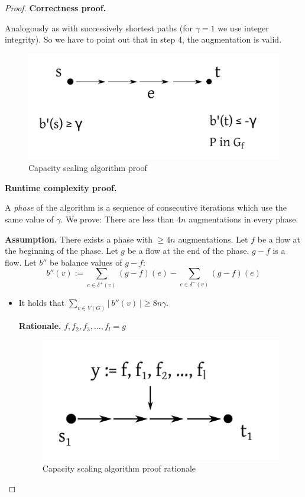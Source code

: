 \documentclass{article}
\newcommand{\card}[1]{\left|\:\!#1\:\!\right|}
\begin{document}
\begin{proof}
  \textbf{Correctness proof.}

  Analogously as with successively shortest paths (for $\gamma = 1$ we use integer integrity).
  So we have to point out that in step 4, the augmentation is valid.

  \begin{figure}[ht]
   \begin{center}
    \includegraphics{img/capacity_scaling_algo_proof.pdf}
    \caption{Capacity scaling algorithm proof}
   \end{center}
  \end{figure}

  \textbf{Runtime complexity proof.}

  A \emph{phase} of the algorithm is a sequence of consecutive iterations which use the same value of $\gamma$. We prove: There are less than $4n$ augmentations in every phase.

  \textbf{Assumption.} There exists a phase with $\geq 4n$ augmentations. Let $f$ be a flow at the beginning of the phase. Let $g$ be a flow at the end of the phase.
  $g-f$ is a flow. Let $b''$ be balance values of $g-f$:
  \[
    b''(v) := \sum_{e \in \delta^+(v)} (g - f)(e) - \sum_{e \in \delta^-(v)} (g - f)(e)
  \]
  \clearpage
  \begin{itemize}
    \item It holds that $\sum_{v \in V(G)} \card{b''(v)} \geq 8n\gamma$.

      \textbf{Rationale.} $f, f_2, f_3, \ldots, f_l = g$

      \begin{figure}[ht]
       \begin{center}
        \includegraphics{img/capacity_scaling_algo_proof_rationale.pdf}
        \caption{Capacity scaling algorithm proof rationale}
       \end{center}
      \end{figure}


\end{itemize}
\end{proof}
\end{document}
